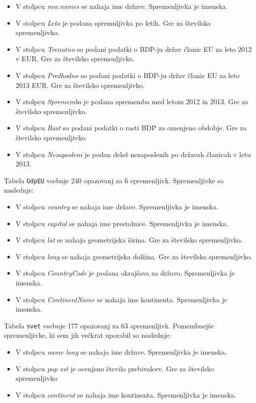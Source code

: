 \documentclass[11pt,a4paper]{article}
\begin{document}
\begin{itemize}
  \item V stolpcu \textit{row.names} se nahaja ime države. Spremenljivka je imenska.
  \item V stolpcu \textit{Leto} je podana spremnljivka po letih. Gre za številsko spremenljivko.
  \item V stolpcu \textit{Trenutno} so podani podatki o BDP-ju držav članic EU za leto 2012 v EUR. Gre za številsko spremenljivko.
  \item V stolpcu \textit{Predhodno} so podani podatki o BDP-ju držav članic EU za leto 2013  EUR. Gre za številsko spremenljivko.
  \item V stolpcu \textit{Sprememba} je podana sprememba med letom 2012 in 2013. Gre za številsko spremenljivko.
  \item V stolpcu \textit{Rast} so podani podatki o rasti BDP za omenjeno obdobje. Gre za številsko spremenljivko.
  \item V stolpcu \textit{Nezaposleni} je podan delež nezaposlenih po državah članicah v letu 2013.
\end{itemize}

Tabela \verb|GdpEU| vsebuje 240 opazovanj za 6 spremenljivk. Spremenljivke so naslednje:

\begin{itemize}
  \item V stolpcu \textit{country} se nahaja ime države. Spremenljivka je imenska.
  \item V stolpcu \textit{capital} se nahaja ime prestolnice. Spremenljivka je imenska.
  \item V stolpcu \textit{lat} se nahaja geometrijska širina. Gre za številsko spremenljivko.
  \item V stolpcu \textit{long} se nahaja geometrijska dolžina. Gre za številsko spremenljivko.
  \item V stolpcu \textit{CountryCode} je podana okrajšava za državo. Spremenljivka je imenska.
  \item V stolpcu \textit{ContinentName} se nahaja ime kontinenta. Spremenljivka je imenska.
\end{itemize}

Tabela \verb|svet| vsebuje 177 opazovanj za 63 spremenljivk. Pomembnejše spremenljivke, ki sem jih večkrat uporabil so naslednje:

\begin{itemize}
  \item V stolpcu \textit{name long} se nahaja ime države. Spremenljivka je imenska.
  
  \item V stolpcu \textit{pop est} je ocenjeno število prebivalcev. Gre za številsko spremenljivko
  
  \item V stolpcu \textit{continent} se nahaja ime kontinenta. Spremenljivka je imenska.
\end{itemize}
\end{document}
